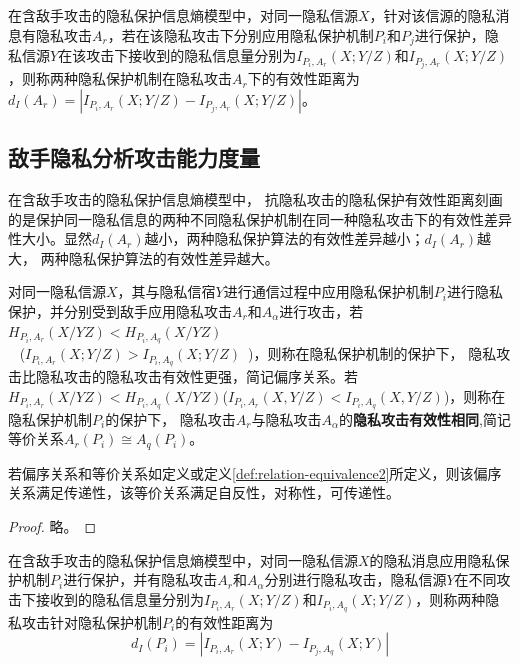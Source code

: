 \begin{definition}[抗隐私攻击的隐私保护有效性距离]
	\label{def:privacy-preserving-performance-distance}
	在含敌手攻击的隐私保护信息熵模型中，对同一隐私信源$X$，针对该信源的隐私消息有隐私攻击$A_{r}$，若在该隐私攻击下分别应用隐私保护机制$P_{i}$和$P_{j}$进行保护，隐私信源$Y$在该攻击下接收到的隐私信息量分别为$I_{P_{i},A_{r}}(X;Y/Z)$和$I_{P_{j},A_{r}}(X;Y/Z)$，则称两种隐私保护机制在隐私攻击$A_{r}$下的有效性距离为$d_{I}(A_{r})=\left | I_{P_{i},A_{r}}(X;Y/Z)-I_{P_{j},A_{r}}(X;Y/Z) \right |$。
\end{definition}

\subsection{敌手隐私分析攻击能力度量}
在含敌手攻击的隐私保护信息熵模型中， 抗隐私攻击的隐私保护有效性距离刻画的是保护同一隐私信息的两种不同隐私保护机制在同一种隐私攻击下的有效性差异性大小。显然$d_{I}(A_{r})$越小，两种隐私保护算法的有效性差异越小；$d_{I}(A_{r})$越大， 两种隐私保护算法的有效性差异越大。

\begin{definition}
	\label{def:relation-equivalence2}
	 对同一隐私信源$X$，其与隐私信宿$Y$进行通信过程中应用隐私保护机制$P_{i}$进行隐私保护，并分别受到敌手应用隐私攻击$A_{r}$和$A_{\alpha }$进行攻击，若~${{H}_{{{P}_{i}},{{A}_{r}}}}(X/YZ)<{{H}_{{{P}_{i}},{{A}_{q}}}}(X/YZ)$\\~ (${{I}_{{{P}_{i}},{{A}_{r}}}}(X;Y/Z)>{{I}_{{{P}_{i}},{{A}_{q}}}}(X;Y/Z)$~)，则称在隐私保护机制的保护下， 隐私攻击比隐私攻击的隐私攻击有效性更强，简记偏序关系。若$H_{P_{i},A_{r}}(X/YZ)<H_{P_{i},A_{q}}(X/YZ)$($I_{P_{i},A_{r}}(X,Y/Z)<I_{P_{i},A_{q}}(X,Y/Z)$)，则称在隐私保护机制$P_{i}$的保护下， 隐私攻击$A_{r}$与隐私攻击$A_{\alpha }$的\textbf{隐私攻击有效性相同},简记等价关系$A_{r}(P_{i})\cong A_{q}(P_{i})$。
\end{definition}

\begin{theorem}
	\label{thm:relation-equivalence}
	若偏序关系和等价关系如定义\label{def:relation-equivalence}或定义\ref{def:relation-equivalence2}所定义，则该偏序关系满足传递性，该等价关系满足自反性，对称性，可传递性。 
\end{theorem}

\begin{proof}
 略。
\end{proof}


\begin{definition}[隐私攻击有效性距离]
	\label{def:privacy-attack-distance}
	在含敌手攻击的隐私保护信息熵模型中，对同一隐私信源$X$的隐私消息应用隐私保护机制$P_{i}$进行保护，并有隐私攻击$A_{r}$和$A_{\alpha}$分别进行隐私攻击，隐私信源$Y$在不同攻击下接收到的隐私信息量分别为$I_{P_{i},A_{r}}(X;Y/Z)$和$I_{P_{i},A_{q}}(X;Y/Z)$，则称两种隐私攻击针对隐私保护机制$P_{i}$的有效性距离为
\begin{equation}
d_{I}(P_{i})=\left | I_{P_{i},A_{r}}(X;Y)-I_{P_{j},A_{q}}(X;Y) \right |
\end{equation}
\end{definition}

